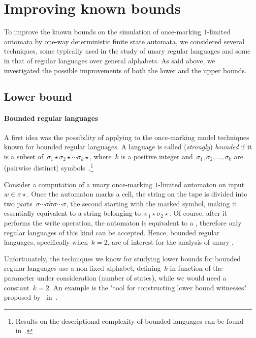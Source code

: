 \section{Improving known bounds}\label{sec:oncemarking-ideas}
To improve the known bounds on the simulation of once-marking $1$-limited automata by one-way deterministic finite state automata, we considered several techniques, some typically used in the study of unary regular languages and some in that of regular languages over general alphabets.
As said above, we investigated the possible improvements of both the lower and the upper bounds.


\subsection{Lower bound}

\paragraph{Bounded regular languages} A first idea was the possibility of applying to the once-marking model techniques known for bounded regular languages.
A language is called (\emph{strongly}) \emph{bounded} if it is a subset of~$\sigma_1\star\sigma_2\star\cdots\sigma_k\star$, where~$k$ is a positive integer and~$\sigma_1,\sigma_2,\dots,\sigma_k$ are (pairwise distinct) symbols~\cite{GinSpa66}.\footnote{%
	Results on the descriptional complexity of bounded languages can be found in~\cite{Gin66,MalPig13,IbaRav16,HerKut+17}.}

Consider a computation of a unary once-marking $1$-limited automaton on input~$w\in\sigma\star$.
Once the automaton marks a cell, the string on the tape is divided into two parts~$\sigma\cdots\sigma \tilde\sigma \sigma\cdots\sigma$, the second starting with the marked symbol, making it essentially equivalent to a string belonging to~$\sigma_1\star\sigma_2\star$.
Of course, after it performs the write operation, the automaton is equivalent to a \TNFA, therefore only regular languages of this kind can be accepted.
Hence, bounded regular languages, specifically when~$k=2$, are of interest for the analysis of unary \OMOLAs.

Unfortunately, the techniques we know for studying lower bounds for bounded regular languages use a non-fixed alphabet, defining~$k$ in function of the parameter under consideration (number of states), while we would need a constant~$k=2$.
An example is the "tool for constructing lower bound witnesses" proposed by~\citeauthor{HerKut+17} in~\cite{HerKut+17}.

